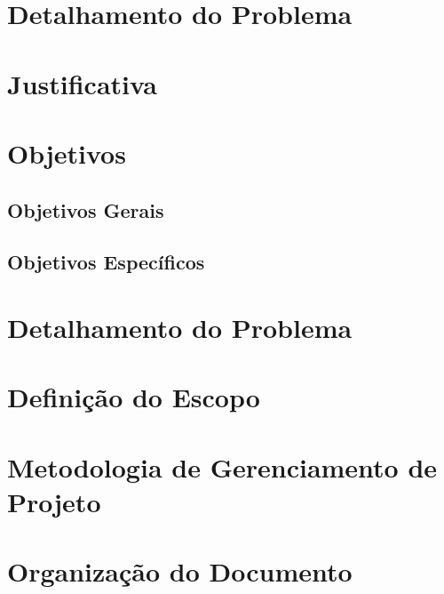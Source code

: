 \section{Detalhamento do Problema} %
\label{sec:detalhamentoProblema}


\section{Justificativa} %
\label{sec:justificativa}


\section{Objetivos} %
\label{sec:objetivos}

  \subsection{Objetivos Gerais} %
  \label{sub:objetivos_gerais}


  \subsection{Objetivos Específicos} %
  \label{sub:objetivos_espec_ficos}



\section{Detalhamento do Problema} %
\label{sec:detalhamentoProblema}

\section{Definição do Escopo} %
\label{sec:defini_o_do_escopo}


\section{Metodologia de Gerenciamento de Projeto} %
\label{sec:metodologia_de_gerenciamento_de_projeto}


\section{Organização do Documento} %
\label{sec:organiza_o_do_documento}

